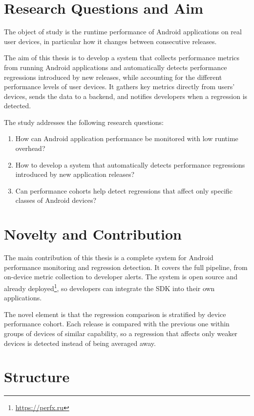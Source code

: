 \section{Research Questions and Aim}

The object of study is the runtime performance of Android applications on real user devices, in particular how it changes between consecutive releases.

The aim of this thesis is to develop a system that collects performance metrics from
running Android applications and automatically detects performance regressions introduced by new releases, while accounting for the different performance levels of user devices. It gathers key metrics directly from users' devices, sends the data to a backend, and notifies developers when a regression is detected.

The study addresses the following research questions:
\begin{enumerate}
    \item How can Android application performance be monitored with low runtime overhead?
    \item How to develop a system that automatically detects performance regressions introduced by new application releases?
    \item Can performance cohorts help detect regressions that affect only specific classes of Android devices?
\end{enumerate}

\section{Novelty and Contribution}

The main contribution of this thesis is a complete system for Android performance monitoring and regression detection. It covers the full pipeline, from on-device metric collection to developer alerts. The system is open source and already deployed\footnote{\url{https://perfx.ru}}, so developers can integrate the SDK into their own applications.

The novel element is that the regression comparison is stratified by device performance cohort. Each release is compared with the previous one within groups of devices of similar capability, so a regression that affects only weaker devices is detected instead of being averaged away.

\section{Structure}

